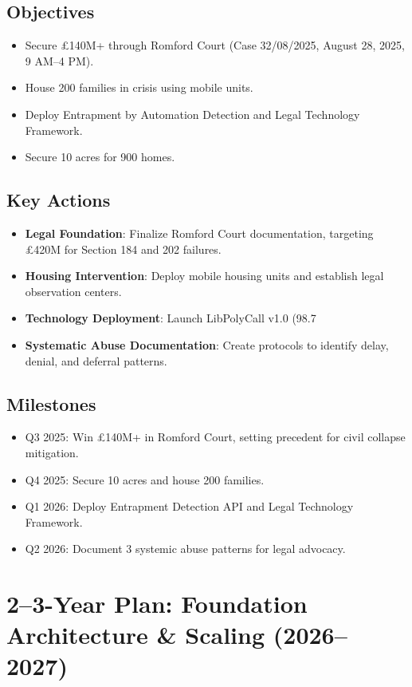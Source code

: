 \documentclass[12pt]{article}\usepackage[a4paper,margin=1in]{geometry}
\begin{document}
\subsection*{Objectives}
\begin{itemize}
    \item Secure £140M+ through Romford Court (Case 32/08/2025, August 28, 2025, 9 AM--4 PM).
    \item House 200 families in crisis using mobile units.
    \item Deploy Entrapment by Automation Detection and Legal Technology Framework.
    \item Secure 10 acres for 900 homes.
\end{itemize}\subsection*{Key Actions}
\begin{itemize}
    \item \textbf{Legal Foundation}: Finalize Romford Court documentation, targeting £420M for Section 184 and 202 failures.
    \item \textbf{Housing Intervention}: Deploy mobile housing units and establish legal observation centers.
    \item \textbf{Technology Deployment}: Launch LibPolyCall v1.0 (98.7%
    \item \textbf{Systematic Abuse Documentation}: Create protocols to identify delay, denial, and deferral patterns.
\end{itemize}\subsection*{Milestones}
\begin{itemize}
    \item Q3 2025: Win £140M+ in Romford Court, setting precedent for civil collapse mitigation.
    \item Q4 2025: Secure 10 acres and house 200 families.
    \item Q1 2026: Deploy Entrapment Detection API and Legal Technology Framework.
    \item Q2 2026: Document 3 systemic abuse patterns for legal advocacy.
\end{itemize}\section*{2--3-Year Plan: Foundation Architecture & Scaling (2026--2027)}
\end{document}
